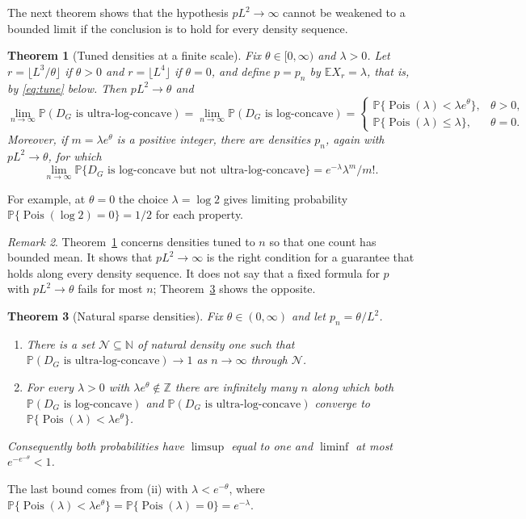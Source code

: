 \documentclass[11pt]{article}
\newtheorem{theorem}{Theorem}[section]
\theoremstyle{remark}
\newtheorem{remark}[theorem]{Remark}
\newcommand{\E}{\mathbb E}
\newcommand{\PP}{\mathbb P}
\newcommand{\Pois}{\operatorname{Pois}}
\begin{document}
The next theorem shows that the hypothesis $pL^2\to\infty$ cannot be weakened to a bounded limit if the conclusion is to hold for every density sequence.

\begin{theorem}[Tuned densities at a finite scale]\label{thm:obstruction}
Fix $\theta\in[0,\infty)$ and $\lambda>0$. Let $r=\lfloor L^3/\theta\rfloor$ if $\theta>0$ and $r=\lfloor L^4\rfloor$ if $\theta=0$, and define $p=p_n$ by $\E X_r=\lambda$, that is, by \eqref{eq:tune} below. Then $pL^2\to\theta$ and
\[
 \lim_{n\to\infty}\PP(D_G\text{ is ultra-log-concave})
 =\lim_{n\to\infty}\PP(D_G\text{ is log-concave})
 =\begin{cases}
 \PP\{\Pois(\lambda)<\lambda e^\theta\},&\theta>0,\\
 \PP\{\Pois(\lambda)\le\lambda\},&\theta=0.
 \end{cases}
\]
Moreover, if $m=\lambda e^\theta$ is a positive integer, there are densities $p_n$, again with $pL^2\to\theta$, for which
\[
 \lim_{n\to\infty}\PP\{D_G\text{ is log-concave but not ultra-log-concave}\}
 = e^{-\lambda}\lambda^m/m!.
\]
\end{theorem}
For example, at $\theta=0$ the choice $\lambda=\log 2$ gives limiting probability $\PP\{\Pois(\log2)=0\}=1/2$ for each property.

\begin{remark}\label{rem:uniform}
Theorem~\ref{thm:obstruction} concerns densities tuned to $n$ so that one count has bounded mean. It shows that $pL^2\to\infty$ is the right condition for a guarantee that holds along every density sequence. It does not say that a fixed formula for $p$ with $pL^2\to\theta$ fails for most $n$; Theorem~\ref{thm:natural} shows the opposite.
\end{remark}

\begin{theorem}[Natural sparse densities]\label{thm:natural}
Fix $\theta\in(0,\infty)$ and let $p_n=\theta/L^2$.
\begin{enumerate}[label=(\roman*)]
\item There is a set $\mathcal N\subseteq\mathbb N$ of natural density one such that $\PP(D_G\text{ is ultra-log-concave})\to1$ as $n\to\infty$ through $\mathcal N$.
\item For every $\lambda>0$ with $\lambda e^\theta\notin\mathbb Z$ there are infinitely many $n$ along which both $\PP(D_G\text{ is log-concave})$ and $\PP(D_G\text{ is ultra-log-concave})$ converge to $\PP\{\Pois(\lambda)<\lambda e^\theta\}$.
\end{enumerate}
Consequently both probabilities have $\limsup$ equal to one and $\liminf$ at most $e^{-e^{-\theta}}<1$.
\end{theorem}
The last bound comes from (ii) with $\lambda<e^{-\theta}$, where $\PP\{\Pois(\lambda)<\lambda e^\theta\}=\PP\{\Pois(\lambda)=0\}=e^{-\lambda}$.
\end{document}
